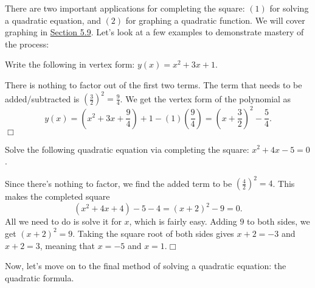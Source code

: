 \documentclass[../book.tex]{subfiles}
\begin{document}
There are two important applications for completing the square: $(1)$ for solving a quadratic equation, and $(2)$ for graphing a quadratic function.  We will cover graphing in \hyperlink{section.5.9}{Section 5.9}.  Let's look at a few examples to demonstrate mastery of the process:
\begin{example}
Write the following in vertex form: $y(x)=x^2+3x+1$.
\end{example}
\begin{solution}
There is nothing to factor out of the first two terms.  The term that needs to be added/subtracted is $\displaystyle \left(\frac{3}{2}\right)^2=\frac{9}{4}$.  We get the vertex form of the polynomial as $$y(x)=\left(x^2+3x+\frac{9}{4}\right)+1-\left(1\right)\left(\frac{9}{4}\right)=\left(x+\frac{3}{2}\right)^2-\frac{5}{4}.$$$\Box$
\end{solution}
\begin{example}
Solve the following quadratic equation via completing the square: $x^2+4x-5=0$.
\end{example}
\begin{solution}
Since there's nothing to factor, we find the added term to be $\displaystyle \left(\frac{4}{2}\right)^2=4$.  This makes the completed square $$\left(x^2+4x+4\right)-5-4=(x+2)^2-9=0.$$  All we need to do is solve it for $x$, which is fairly easy.  Adding $9$ to both sides, we get $(x+2)^2=9$.  Taking the square root of both sides gives $x+2=-3$ and $x+2=3$, meaning that $x=-5$ and $x=1$.$\Box$
\end{solution}
\noindent Now, let's move on to the final method of solving a quadratic equation: the quadratic formula.
\end{document}
